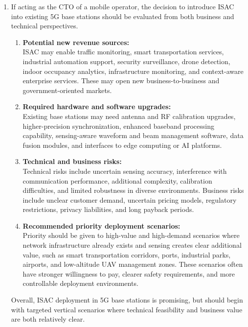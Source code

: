 \begin{enumerate}[label=\textbf{\arabic*.}, leftmargin=*]
    \item 
    If acting as the CTO of a mobile operator, the decision to introduce ISAC into existing 5G base stations should be evaluated from both business and technical perspectives.

    \begin{enumerate}[label=(\alph*)]
        \item \textbf{Potential new revenue sources:} \\
        ISAC may enable traffic monitoring, smart transportation services, industrial automation support, security surveillance, drone detection, indoor occupancy analytics, infrastructure monitoring, and context-aware enterprise services. These may open new business-to-business and government-oriented markets.

        \item \textbf{Required hardware and software upgrades:} \\
        Existing base stations may need antenna and RF calibration upgrades, higher-precision synchronization, enhanced baseband processing capability, sensing-aware waveform and beam management software, data fusion modules, and interfaces to edge computing or AI platforms.

        \item \textbf{Technical and business risks:} \\
        Technical risks include uncertain sensing accuracy, interference with communication performance, additional complexity, calibration difficulties, and limited robustness in diverse environments. Business risks include unclear customer demand, uncertain pricing models, regulatory restrictions, privacy liabilities, and long payback periods.

        \item \textbf{Recommended priority deployment scenarios:} \\
        Priority should be given to high-value and high-demand scenarios where network infrastructure already exists and sensing creates clear additional value, such as smart transportation corridors, ports, industrial parks, airports, and low-altitude UAV management zones. These scenarios often have stronger willingness to pay, clearer safety requirements, and more controllable deployment environments.
    \end{enumerate}

    Overall, ISAC deployment in 5G base stations is promising, but should begin with targeted vertical scenarios where technical feasibility and business value are both relatively clear.

\end{enumerate}